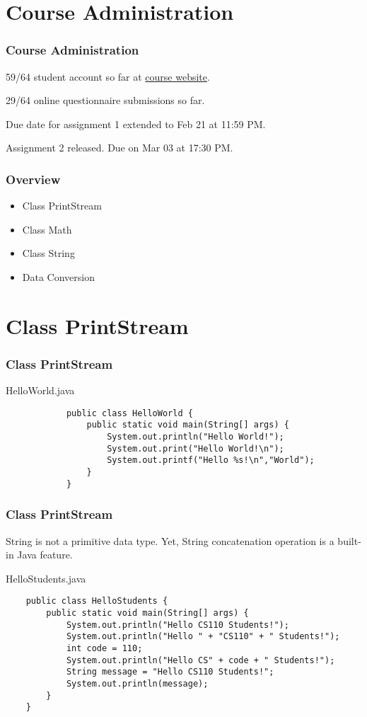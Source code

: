 \documentclass[10pt, compress]{beamer}
\begin{document}
\prepareCover

\section{Course Administration}

\begin{frame}[fragile]
\frametitle{Course Administration}
	59/64 student account so far at \href{http://ghorbanzade.com/}{course website}.

	29/64 online questionnaire submissions so far.

	Due date for assignment 1 extended to Feb 21 at 11:59 PM.

	Assignment 2 released. Due on Mar 03 at 17:30 PM.
\end{frame}

\begin{frame}[fragile]
	\frametitle{Overview}
	\begin{itemize}
		\item[] Class PrintStream
		\item[] Class Math
		\item[] Class String
		\item[] Data Conversion
	\end{itemize}
\end{frame}

\section{Class PrintStream}

\begin{frame}[fragile]
	\frametitle{Class PrintStream}
	\begin{block}{HelloWorld.java}
		\begin{verbatim}
			public class HelloWorld {
				public static void main(String[] args) {
					System.out.println("Hello World!");
					System.out.print("Hello World!\n");
					System.out.printf("Hello %s!\n","World");
				}
			}
		\end{verbatim}
	\end{block}
\end{frame}

\begin{frame}[fragile]
	\frametitle{Class PrintStream}
	String is not a primitive data type. Yet, String concatenation operation is a built-in Java feature.
	\begin{block}{HelloStudents.java}
	\begin{verbatim}
	public class HelloStudents {
		public static void main(String[] args) {
			System.out.println("Hello CS110 Students!");
			System.out.println("Hello " + "CS110" + " Students!");
			int code = 110;
			System.out.println("Hello CS" + code + " Students!");
			String message = "Hello CS110 Students!";
			System.out.println(message);
		}
	}
	\end{verbatim}
	\end{block}
\end{frame}
\end{document}
